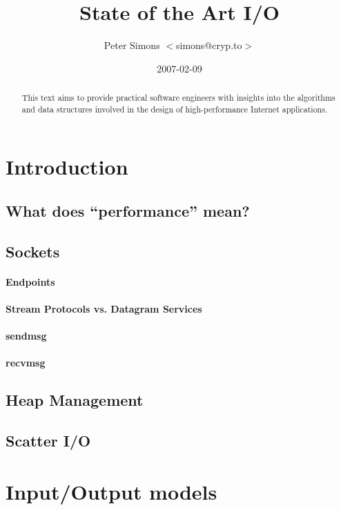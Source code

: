 \documentclass[abstracton,a4paper,twocolumn,9pt]{scrartcl}
\def\LASTCHANGED{2007-02-09}    %
\begin{document}
\title{State of the Art I/O}
\author{Peter Simons $<$simons@cryp.to$>$}
\date{\LASTCHANGED}
\maketitle

\begin{abstract}
  This text aims to provide practical software engineers with insights
  into the algorithms and data structures involved in the design of
  high-performance Internet applications.
\end{abstract}

\section{Introduction} %

  \subsection{What does ``performance'' mean?}
  \subsection{Sockets}
    \paragraph{Endpoints}
    \paragraph{Stream Protocols vs. Datagram Services}
    \paragraph{sendmsg}
    \paragraph{recvmsg}
  \subsection{Heap Management}
  \subsection{Scatter I/O}

\section{Input/Output models}
\end{document}
